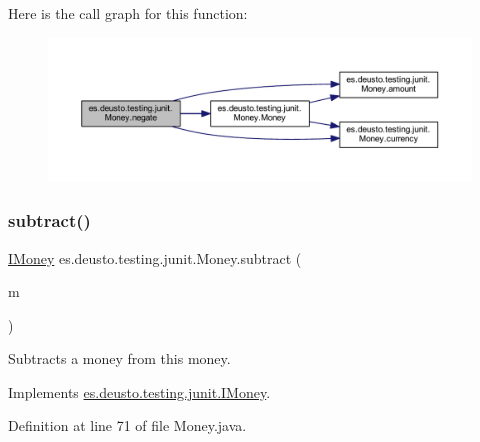 Here is the call graph for this function\+:
\nopagebreak
\begin{figure}[H]
\begin{center}
\leavevmode
\includegraphics[width=350pt]{classes_1_1deusto_1_1testing_1_1junit_1_1_money_ae5f0bc3ea87f1fd55d6478653b8f2e36_cgraph}
\end{center}
\end{figure}
\mbox{\label{classes_1_1deusto_1_1testing_1_1junit_1_1_money_aada973cd1a31410ed2b7e5d2ae6bc2e9}} 
\subsubsection{\texorpdfstring{subtract()}{subtract()}}
{\footnotesize\ttfamily \hyperlink{interfacees_1_1deusto_1_1testing_1_1junit_1_1_i_money}{I\+Money} es.\+deusto.\+testing.\+junit.\+Money.\+subtract (\begin{DoxyParamCaption}\item[{\hyperlink{interfacees_1_1deusto_1_1testing_1_1junit_1_1_i_money}{I\+Money}}]{m }\end{DoxyParamCaption})}

Subtracts a money from this money. 

Implements \hyperlink{interfacees_1_1deusto_1_1testing_1_1junit_1_1_i_money_a1fb4981aa759e3fe0679654bec7a8b61}{es.\+deusto.\+testing.\+junit.\+I\+Money}.



Definition at line 71 of file Money.\+java.

